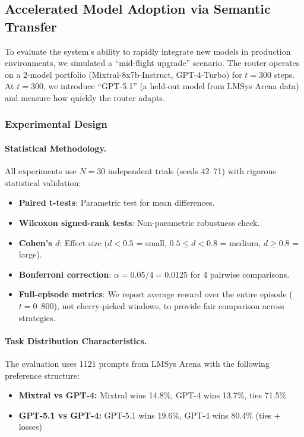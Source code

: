 
\subsection{Accelerated Model Adoption via Semantic Transfer}
\label{sec:accelerated-adoption}

To evaluate the system's ability to rapidly integrate new models in production environments, we simulated a ``mid-flight upgrade'' scenario. The router operates on a 2-model portfolio (Mixtral-8x7b-Instruct, GPT-4-Turbo) for $t=300$ steps. At $t=300$, we introduce ``GPT-5.1'' (a held-out model from LMSys Arena data) and measure how quickly the router adapts.

\subsubsection{Experimental Design}

\paragraph{Statistical Methodology.}
All experiments use $N=30$ independent trials (seeds 42--71) with rigorous statistical validation:
\begin{itemize}
    \item \textbf{Paired t-tests}: Parametric test for mean differences.
    \item \textbf{Wilcoxon signed-rank tests}: Non-parametric robustness check.
    \item \textbf{Cohen's $d$}: Effect size ($d < 0.5$ = small, $0.5 \leq d < 0.8$ = medium, $d \geq 0.8$ = large).
    \item \textbf{Bonferroni correction}: $\alpha = 0.05/4 = 0.0125$ for 4 pairwise comparisons.
    \item \textbf{Full-episode metrics}: We report average reward over the entire episode ($t=0$--$800$), not cherry-picked windows, to provide fair comparison across strategies.
\end{itemize}

\paragraph{Task Distribution Characteristics.}
The evaluation uses 1121 prompts from LMSys Arena with the following preference structure:
\begin{itemize}
    \item \textbf{Mixtral vs GPT-4:} Mixtral wins 14.8\%, GPT-4 wins 13.7\%, ties 71.5\%
    \item \textbf{GPT-5.1 vs GPT-4:} GPT-5.1 wins 19.6\%, GPT-4 wins 80.4\% (ties + losses)
\end{itemize}

